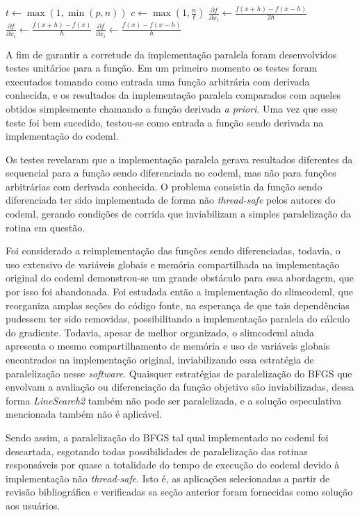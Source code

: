\documentclass[cic,tc]{iiufrgs}
\begin{document}
\begin{algorithmic}
\State $t \gets \max(1, \min(p, n))$
\State $c \gets \max(1, \frac{n}{t})$
    \State $\frac{\partial f}{\partial x_i} \gets \frac{f(x+h)-f(x-h)}{2h}$
    \State $\frac{\partial f}{\partial x_i} \gets \frac{f(x+h)-f(x)}{h}$
  \Else
    \State $\frac{\partial f}{\partial x_i} \gets \frac{f(x)-f(x-h)}{h}$
  \EndIf
\EndFor
\end{algorithmic}

A fim de garantir a corretude da implementação paralela foram desenvolvidos
testes unitários para a função. Em um primeiro momento os testes foram
executados tomando como entrada uma função arbitrária com derivada conhecida,
e os resultados da implementação paralela comparados com aqueles obtidos
simplesmente chamando a função derivada \textit{a priori}. Uma vez que esse
teste foi bem sucedido, testou-se como entrada a função sendo derivada na
implementação do codeml.

Os testes revelaram que a implementação paralela gerava resultados diferentes
da sequencial para a função sendo diferenciada no codeml, mas não para funções
arbitrárias com derivada conhecida. O problema consistia da função sendo
diferenciada ter sido implementada de forma não \textit{thread-safe} pelos
autores do codeml, gerando condições de corrida que inviabilizam a simples
paralelização da rotina em questão.

Foi considerado a reimplementação das funções sendo diferenciadas, todavia, o
uso extensivo de variáveis globais e memória compartilhada na implementação
original do codeml demonstrou-se um grande obstáculo para essa abordagem, que
por isso foi abandonada. Foi estudada então a implementação do slimcodeml, que
reorganiza amplas seções do código fonte, na esperança de que tais
dependências pudessem ter sido removidas, possibilitando a implementação
paralela do cálculo do gradiente. Todavia, apesar de melhor organizado, o
slimcodeml ainda apresenta o mesmo compartilhamento de memória e uso de
variáveis globais encontrados na implementação original, inviabilizando essa
estratégia de paralelização nesse \textit{software}. Quaisquer estratégias de
paralelização do BFGS que envolvam a avaliação ou diferenciação da função
objetivo são inviabilizadas, dessa forma \textit{LineSearch2} também não pode
ser paralelizada, e a solução especulativa mencionada também não é aplicável.

Sendo assim, a paralelização do BFGS tal qual implementado no codeml foi
descartada, esgotando todas possibilidades de paralelização das rotinas
responsáveis por quase a totalidade do tempo de execução do codeml devido à
implementação não \textit{thread-safe}. Isto é, as aplicações selecionadas a
partir de revisão bibliográfica e verificadas sa seção anterior foram
fornecidas como solução aos usuários.
\end{document}
